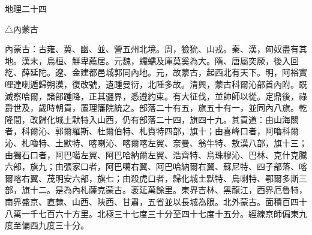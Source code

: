 
\begin{pinyinscope}
地理二十四

△內蒙古

內蒙古：古雍、冀、幽、並、營五州北境。周，獫狁、山戎。秦、漢，匈奴盡有其地。漢末，烏桓、鮮卑薦居。元魏，蠕蠕及庫莫奚為大。隋、唐屬突厥，後入回紇、薛延陀。遼、金建都邑城郭同內地。元，故蒙古，起西北有天下。明，阿裕實哩達喇遁歸朔漠，復改號，遺踵曼衍，北陲多故。清興，蒙古科爾沁部首內附。既滅察哈爾，諸部踵降，正其疆界，悉遵約束。有大征伐，並帥師以從。定鼎後，祿爵世及，歲時朝貢，置理籓院統之。部落二十有五，旗五十有一，並同內八旗。乾隆間，改歸化城土默特入山西，仍有部落二十四，旗四十九。其貢道：由山海關者，科爾沁、郭爾羅斯、杜爾伯特、札賚特四部，旗十；由喜峰口者，阿嚕科爾沁、札嚕特、土默特、喀喇沁、喀爾喀左翼、奈曼、翁牛特、敖漢八部，旗十三；由獨石口者，阿巴噶左翼、阿巴哈納爾左翼、浩齊特、烏珠穆沁、巴林、克什克騰六部，旗九；由張家口者，阿巴噶右翼、阿巴哈納爾右翼、蘇尼特、四子部落、喀爾喀右翼、茂明安六部，旗七；由殺虎口者，歸化城土默特、烏喇特、鄂爾多斯三部，旗十二。是為內札薩克蒙古。袤延萬餘里。東界吉林、黑龍江，西界厄魯特，南界盛京、直隸、山西、陜西、甘肅，五省並以長城為限。北外蒙古。面積百四十八萬一千七百六十方里。北極三十七度三十分至四十七度十五分。經線京師偏東九度至偏西九度三十分。


\end{pinyinscope}
